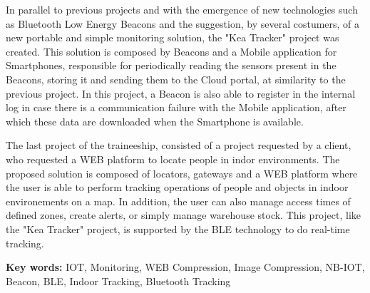 \par In parallel to previous projects and with the emergence of new technologies such as Bluetooth Low Energy Beacons and the suggestion, by several costumers, of a new portable and simple monitoring solution, the "Kea Tracker" project was created. This solution is composed by Beacons and a Mobile application for Smartphones, responsible for periodically reading the sensors present in the Beacons, storing it and sending them to the Cloud portal, at similarity to the previous project. In this project, a Beacon is also able to register in the internal log in case there is a communication failure with the Mobile application, after which these data are downloaded when the Smartphone is available.


\par The last project of the traineeship, consisted of a project requested by a client, who requested a WEB platform to locate people in indor environments. The proposed solution is composed of locators, gateways and a WEB platform where the user is able to perform tracking operations of people and objects in indoor environements on a map. In addition, the user can also manage access times of defined zones, create alerts, or simply manage warehouse stock. This project, like the "Kea Tracker" project, is supported by the BLE technology to do real-time tracking.



\bigskip

\textbf{Key words:} 
IOT, Monitoring, WEB Compression, Image Compression, NB-IOT, Beacon, BLE, Indoor Tracking, Bluetooth Tracking